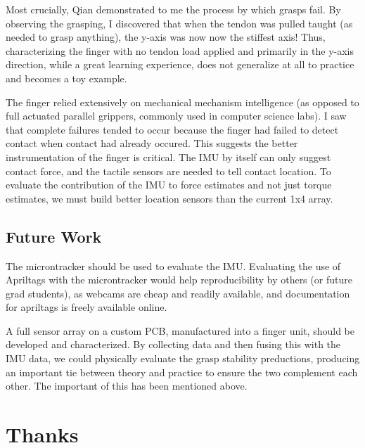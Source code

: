 \documentclass[preprint,12pt,3p]{elsarticle}
\begin{document}
Most crucially, Qian demonstrated to me the process by which grasps fail. By observing the grasping,
I discovered that when the tendon was pulled taught (as needed to grasp anything), the y-axis was now
now the stiffest axis! Thus, characterizing the finger with no tendon load applied and primarily in
the y-axis direction, while a great learning experience, does not generalize at all to practice and becomes a
toy example.

The finger relied extensively on mechanical mechanism intelligence (as opposed to full
actuated parallel grippers, commonly used in computer science labs).  I saw that complete failures
tended to occur because the finger had failed to detect contact when contact had already occured.
This suggests the better instrumentation of the finger is critical. The IMU by itself can only
suggest contact force, and the tactile sensors are needed to tell contact location. To evaluate the
contribution of the IMU to force estimates and not just torque estimates, we must build better
location sensors than the current 1x4 array.


%
%

\subsection{Future Work}

The microntracker should be used to evaluate the IMU. Evaluating the use of Apriltags with the
microntracker would help reproducibility by others (or future grad students), as webcams are cheap
and readily available, and documentation for apriltags is freely available online.

A full sensor array on a custom PCB, manufactured into a finger unit, should be
developed and characterized. By collecting data and then fusing this with the IMU data, we could
physically evaluate the grasp stability preductions, producing an important tie between theory and
practice to ensure the two complement each other. The important of this has been mentioned above.

\section{Thanks}
\end{document}
